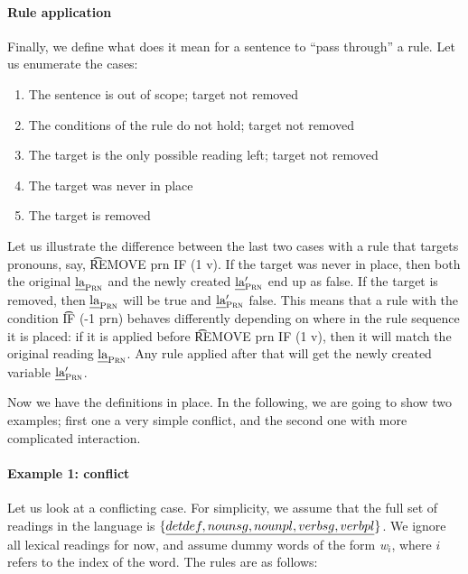 \paragraph{Rule application}
Finally, we define what does it mean for a sentence to ``pass through'' a rule.
Let us enumerate the cases:
\begin{enumerate}
\item The sentence is out of scope; target not removed
\item The conditions of the rule do not hold; target not removed
\item The target is the only possible reading left; target not removed
\item The target was never in place
\item The target is removed
\end{enumerate}
Let us illustrate the difference between the last two cases with a rule that targets pronouns, say, \t{REMOVE prn IF (1 v)}.
If the target was never in place, then both the original $\text{\em la}_{\text{\sc Prn}}$ and the newly created $\text{\em la}{}'_{\text{\sc Prn}}$ end up as false.
If the target is removed, then $\text{\em la}_{\text{\sc Prn}}$ will be true and $\text{\em la}{}'_{\text{\sc Prn}}$ false.
This means that a rule with the condition \t{IF (-1 prn)} behaves differently depending on where in the rule sequence it is placed:
if it is applied before \t{REMOVE prn IF (1 v)}, then it will match the original reading $\text{\em la}_{\text{\sc Prn}}$. Any rule applied after that will get the newly created variable $\text{\em la}{}'_{\text{\sc Prn}}$.


Now we have the definitions in place. In the following, we are going to show two examples; first one a very simple conflict, and the second one with more complicated interaction.


\paragraph{Example 1: conflict}

Let us look at a conflicting case. For simplicity, we assume that the full set of readings in the language is $\{ \emph{det def, noun sg, noun pl, verb sg, verb pl} \}$. We ignore all lexical readings for now, and assume dummy words of the form \emph{w$_{i}$}, where $i$ refers to the index of the word.
The rules are as follows:


